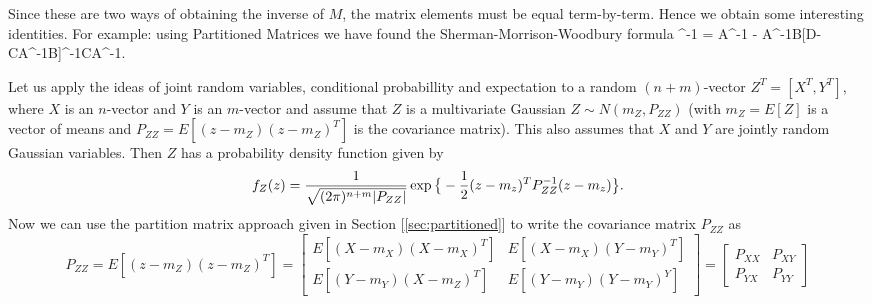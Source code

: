 Since these are two ways of obtaining the inverse of $M$, the matrix elements must be equal term-by-term. Hence we obtain some interesting identities. For example: 
using Partitioned Matrices we have found the Sherman-Morrison-Woodbury formula
\be [A -BD^{-1}C]^{-1} = A^{-1} - A^{-1}B[D-CA^{-1}B]^{-1}CA^{-1}. \label{eqn:InverseMatrixIdentity}\ee 

Let us apply the ideas of joint random variables, conditional probabillity and expectation to a random $(n+m)$-vector $Z^T = [X^T,Y^T]$, where $X$ is an $n$-vector and $Y$ is an $m$-vector and assume that $Z$ is a multivariate Gaussian $Z \sim N(m_Z, P_{ZZ})$ (with $m_Z = E[Z]$ is a vector of means and $P_{ZZ} = E[(z-m_Z)(z-m_Z)^T]$ is the covariance matrix). This also assumes that $X$ and $Y$ are jointly random Gaussian variables. 
Then $Z$ has a probability density function given by 
\begin{equation} f_Z(z) = {1\over \sqrt{(2\pi)^{n+m} |P_{ZZ}|} } \exp\big\{-{1\over2} (z-m_z)^T P_{ZZ}^{-1} (z-m_z) \big\}.\label{eqn:multiGaussian}\end{equation}
Now we can use the partition matrix approach given in Section [\ref{sec:partitioned}] to write the covariance matrix $P_{ZZ}$ as
$$P_{ZZ} = E[(z - m_Z)(z-m_Z)^T] = 
\begin{bmatrix}
E[(X-m_X)(X-m_X)^T]  & E[(X-m_X)(Y-m_Y)^T] \\
E[(Y-m_Y)(X-m_Z)^T]  & E[(Y-m_Y)(Y-m_Y)^Y]
\end{bmatrix}
=\begin{bmatrix}
P_{XX}  & P_{XY} \\
P_{YX} & P_{YY} 
\end{bmatrix}
$$


